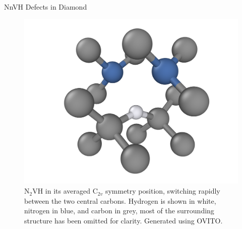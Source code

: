 \documentclass[final]{beamer}
\newlength{\colwidth}
\begin{document}
\begin{frame}[t]
\begin{columns}[t]
\begin{column}{\colwidth}
\begin{block}{NnVH Defects in Diamond}
    
    \begin{figure}
      \centering
        \includegraphics[width=\textwidth]{n2vh_coloured.png}
      \caption{N$_2$VH in its averaged C$_{2v}$ symmetry position, switching rapidly between the two central carbons. Hydrogen is shown in white, nitrogen in blue, and carbon in grey, most of the surrounding structure has been omitted for clarity. Generated using OVITO.}
    \end{figure}



  \end{block}


\end{column}
\end{columns}
\end{frame}
\end{document}
